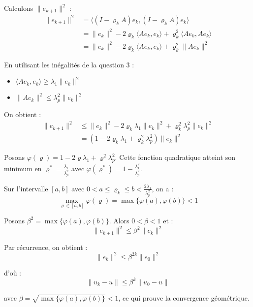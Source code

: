 {\begin{enumerate}
{Calculons $\|e_{k+1}\|^2$ :
\begin{align*}
\|e_{k+1}\|^2 &= \langle (I - \varrho_k A)e_k, (I - \varrho_k A)e_k \rangle\\
&= \|e_k\|^2 - 2\varrho_k \langle Ae_k, e_k \rangle + \varrho_k^2 \langle Ae_k, Ae_k \rangle\\
&= \|e_k\|^2 - 2\varrho_k \langle Ae_k, e_k \rangle + \varrho_k^2 \|Ae_k\|^2
\end{align*}

En utilisant les inégalités de la question 3 :
\begin{itemize}
\item $\langle Ae_k, e_k \rangle \geq \lambda_1 \|e_k\|^2$
\item $\|Ae_k\|^2 \leq \lambda_p^2 \|e_k\|^2$
\end{itemize}

On obtient :
\begin{align*}
\|e_{k+1}\|^2 &\leq \|e_k\|^2 - 2\varrho_k \lambda_1 \|e_k\|^2 + \varrho_k^2 \lambda_p^2 \|e_k\|^2\\
&= (1 - 2\varrho_k \lambda_1 + \varrho_k^2 \lambda_p^2)\|e_k\|^2
\end{align*}

Posons $\varphi(\varrho) = 1 - 2\varrho \lambda_1 + \varrho^2 \lambda_p^2$. Cette fonction quadratique atteint son minimum en $\varrho^* = \frac{\lambda_1}{\lambda_p^2}$ avec $\varphi(\varrho^*) = 1 - \frac{\lambda_1^2}{\lambda_p^2}$.

Sur l'intervalle $[a,b]$ avec $0 < a \leq \varrho_k \leq b < \frac{2\lambda_1}{\lambda_p^2}$, on a :
$$\max_{\varrho \in [a,b]} \varphi(\varrho) = \max\{\varphi(a), \varphi(b)\} < 1$$

Posons $\beta^2 = \max\{\varphi(a), \varphi(b)\}$. Alors $0 < \beta < 1$ et :
$$\|e_{k+1}\|^2 \leq \beta^2 \|e_k\|^2$$

Par récurrence, on obtient :
$$\|e_k\|^2 \leq \beta^{2k} \|e_0\|^2$$

d'où :
$$\boxed{\|u_k - u\| \leq \beta^k \|u_0 - u\|}$$

avec $\beta = \sqrt{\max\{\varphi(a), \varphi(b)\}} < 1$, ce qui prouve la convergence géométrique.
}
\end{enumerate}

}


















